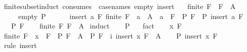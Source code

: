 \begin{isabellebody}
%
\endisatagproof
{\isafoldproof}%
%
\isadelimproof
\isanewline
%
\endisadelimproof
\isanewline
{}\isamarkupfalse%
\ finite{\isacharunderscore}{\kern0pt}subset{\isacharunderscore}{\kern0pt}induct\ {\isacharbrackleft}{\kern0pt}consumes\ {}{\isacharcomma}{\kern0pt}\ case{\isacharunderscore}{\kern0pt}names\ empty\ insert{\isacharbrackright}{\kern0pt}{\isacharcolon}{\kern0pt}\isanewline
\ \ \ {\isachardoublequoteopen}finite\ F{\isachardoublequoteclose}\ \ {\isachardoublequoteopen}F\ {\isasymsubseteq}\ A{\isachardoublequoteclose}\isanewline
\ \ \ \ \ empty{\isacharcolon}{\kern0pt}\ {\isachardoublequoteopen}P\ {\isacharbraceleft}{\kern0pt}{\isacharbraceright}{\kern0pt}{\isachardoublequoteclose}\isanewline
\ \ \ \ \ insert{\isacharcolon}{\kern0pt}\ {\isachardoublequoteopen}{\isasymAnd}a\ F{\isachardot}{\kern0pt}\ finite\ F\ {\isasymLongrightarrow}\ a\ {\isasymin}\ A\ {\isasymLongrightarrow}\ a\ {\isasymnotin}\ F\ {\isasymLongrightarrow}\ P\ F\ {\isasymLongrightarrow}\ P\ {\isacharparenleft}{\kern0pt}insert\ a\ F{\isacharparenright}{\kern0pt}{\isachardoublequoteclose}\isanewline
\ \ \ {\isachardoublequoteopen}P\ F{\isachardoublequoteclose}\isanewline
%
\isadelimproof
\ \ %
\endisadelimproof
%
\isatagproof
{}\isamarkupfalse%
\ {\isacartoucheopen}finite\ F{\isacartoucheclose}\ {\isacartoucheopen}F\ {\isasymsubseteq}\ A{\isacartoucheclose}\isanewline
{}\isamarkupfalse%
\ induct\isanewline
\ \ \isamarkupfalse%
\ {\isachardoublequoteopen}P\ {\isacharbraceleft}{\kern0pt}{\isacharbraceright}{\kern0pt}{\isachardoublequoteclose}\ \isamarkupfalse%
\ fact\isanewline
{}\isamarkupfalse%
\isanewline
\ \ \isamarkupfalse%
\ x\ F\isanewline
\ \ \isamarkupfalse%
\ {\isachardoublequoteopen}finite\ F{\isachardoublequoteclose}\ \ {\isachardoublequoteopen}x\ {\isasymnotin}\ F{\isachardoublequoteclose}\ \ P{\isacharcolon}{\kern0pt}\ {\isachardoublequoteopen}F\ {\isasymsubseteq}\ A\ {\isasymLongrightarrow}\ P\ F{\isachardoublequoteclose}\ \ i{\isacharcolon}{\kern0pt}\ {\isachardoublequoteopen}insert\ x\ F\ {\isasymsubseteq}\ A{\isachardoublequoteclose}\isanewline
\ \ \isamarkupfalse%
\ {\isachardoublequoteopen}P\ {\isacharparenleft}{\kern0pt}insert\ x\ F{\isacharparenright}{\kern0pt}{\isachardoublequoteclose}\isanewline
\ \ \isamarkupfalse%
\ {\isacharparenleft}{\kern0pt}rule\ insert{\isacharparenright}{\kern0pt}\isanewline

\end{isabellebody}
